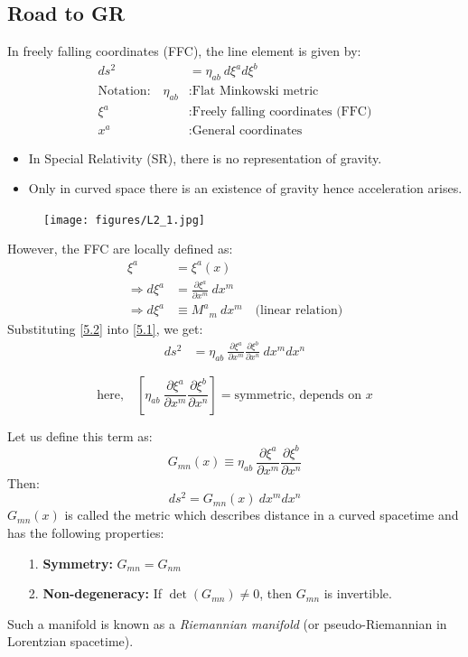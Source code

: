 \documentclass[14pt]{article} %
\begin{document}
\subsection{Road to GR}
In freely falling coordinates (FFC), the line element is given by:
\begin{align*}
    ds^2 &= \eta_{ab}~d\xi^a d\xi^b \tag{5.1} \label{5.1} \\
    \text{Notation:} \quad 
    \eta_{ab} &: \text{Flat Minkowski metric} \\
    \xi^a &: \text{Freely falling coordinates (FFC)} \\
    x^a &: \text{General coordinates}
\end{align*}
\begin{tcolorbox}[proofbox, title=\textbf{Note:}]
\begin{itemize}
    \item In Special Relativity (SR), there is no representation of gravity.
    \item Only in curved space there is an existence of gravity hence acceleration arises.
\end{itemize}
\end{tcolorbox}
\begin{figure}[H]
\centering
\texttt{[image: figures/L2\_1.jpg]}
\caption*{}
\vspace{-1em}
\end{figure}
However, the FFC are locally defined as:
\begin{align*}
    \xi^a &= \xi^a(x) \\
    \Rightarrow d\xi^a &= \frac{\partial \xi^a}{\partial x^m}~ dx^m \tag{5.2} \label{5.2} \\
    \Rightarrow d\xi^a &\equiv M^a{}_m~dx^m \quad \text{(linear relation)}
\end{align*}
Substituting \eqref{5.2} into \eqref{5.1}, we get:
\begin{align*}
    ds^2 &= \eta_{ab}~\frac{\partial \xi^a}{\partial x^m} \frac{\partial \xi^b}{\partial x^n}~dx^m dx^n \tag{5.3} \label{5.3}
\end{align*}

\[\text{here,}\quad
\left[ \eta_{ab}~ \frac{\partial \xi^a}{\partial x^m} \frac{\partial \xi^b}{\partial x^n} \right] = \text{symmetric, depends on } x
\]

Let us define this term as:
\[
G_{mn}(x) \equiv \eta_{ab}~ \frac{\partial \xi^a}{\partial x^m} \frac{\partial \xi^b}{\partial x^n}
\]
Then:
\[
ds^2 = G_{mn}(x)~dx^m dx^n
\]
$G_{mn}(x)$ is called the metric which describes distance in a curved spacetime and has the following properties:
\begin{itemize}
    \item[1.] \textbf{Symmetry:} $G_{mn} = G_{nm}$
    \item[2.] \textbf{Non-degeneracy:} If $\det(G_{mn}) \neq 0$, then $G_{mn}$ is invertible.
\end{itemize}
Such a manifold is known as a \textit{Riemannian manifold} (or pseudo-Riemannian in Lorentzian spacetime).
\end{document}
